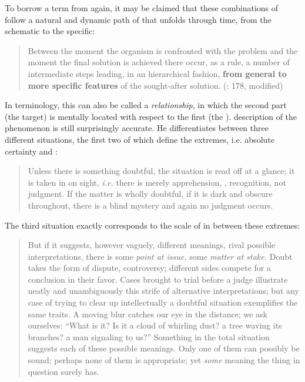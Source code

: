 To borrow a term from \citet{Langacker2008} again, it may be claimed that these combinations of  follow a natural and dynamic path of \textit{} that unfolds through time, from the schematic to the specific:

\begin{quote}
Between the moment the organism is confronted with the problem and the moment the final solution is achieved there occur, as a rule, a number of intermediate steps leading, in an hierarchical fashion, \textbf{from general to more specific features} of the sought-after solution. (\citealt{Duncker1939}: 178,  modified)
\end{quote}

In  terminology, this can also be called a \textit{ relationship}, in which the second part (the target) is mentally located with respect to the first (the ).  description of the phenomenon is still surprisingly accurate. He differentiates between three different situations, the first two of which define the extremes, i.e. absolute certainty and :

\begin{quote}
Unless there is something doubtful, the situation is read off at a glance; it is taken in on sight, \textit{i.e.} there is merely apprehension, , recognition, not judgment. If the matter is wholly doubtful, if it is dark and obscure throughout, there is a blind mystery and again no judgment occurs.
\end{quote}

\noindent The third situation exactly corresponds to the scale of  in between these extremes:

\begin{quote}
But if it suggests, however vaguely, different meanings, rival possible interpretations, there is some \textit{point at issue,} some \textit{matter at stake.} Doubt takes the form of dispute, controversy; different sides compete for a conclusion in their favor. Cases brought to trial before a judge illustrate neatly and unambiguously this strife of alternative interpretations; but any case of trying to clear up intellectually a doubtful situation exemplifies the same traits. A moving blur catches our eye in the distance; we ask ourselves: “What is it? Is it a cloud of whirling dust? a tree waving its branches? a man signaling to us?” Something in the total situation suggests each of these possible meanings. Only one of them can possibly be sound; perhaps none of them is appropriate; yet \textit{some} meaning the thing in question surely has.
\end{quote}

